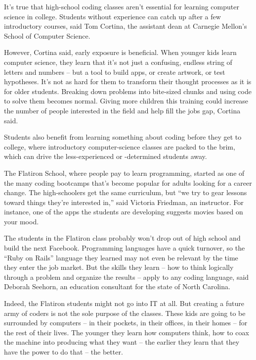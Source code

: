 It's true that high-school coding classes aren't essential for learning computer science in college. Students without experience can catch up after a few introductory courses, said Tom Cortina, the assistant dean at Carnegie Mellon's School of Computer Science.


However, Cortina said, early exposure is beneficial. When younger kids learn computer science, they learn that it's not just a confusing, endless string of letters and numbers – but a tool to build apps, or create artwork, or test hypotheses. It's not as hard for them to transform their thought processes as it is for older students. Breaking down problems into bite-sized chunks and using code to solve them becomes normal. Giving more children this training could increase the number of people interested in the field and help fill the jobs gap, Cortina said.


Students also benefit from learning something about coding before they get to college, where introductory computer-science classes are packed to the brim, which can drive the less-experienced or -determined students away.


The Flatiron School, where people pay to learn programming, started as one of the many coding bootcamps that's become popular for adults looking for a career change. The high-schoolers get the same curriculum, but ``we try to gear lessons toward things they're interested in,'' said Victoria Friedman, an instructor. For instance, one of the apps the students are developing suggests movies based on your mood.


The students in the Flatiron class probably won't drop out of high school and build the next Facebook. Programming languages have a quick turnover, so the ``Ruby on Rails'' language they learned may not even be relevant by the time they enter the job market. But the skills they learn – how to think logically through a problem and organize the results – apply to any coding language, said Deborah Seehorn, an education consultant for the state of North Carolina.


Indeed, the Flatiron students might not go into IT at all. But creating a future army of coders is not the sole purpose of the classes. These kids are going to be surrounded by computers – in their pockets, in their offices, in their homes – for the rest of their lives. The younger they learn how computers think, how to coax the machine into producing what they want – the earlier they learn that they have the power to do that – the better.


